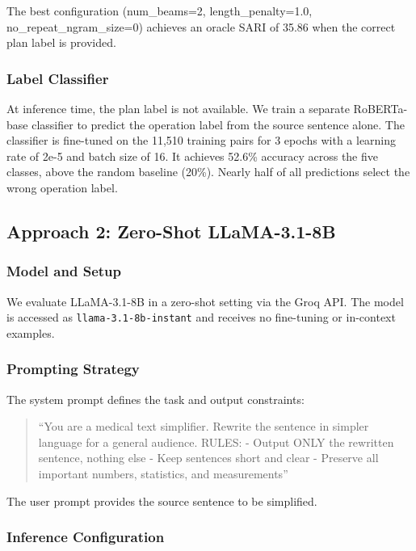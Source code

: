 \documentclass{ceurart}
\begin{document}
The best configuration (num\_beams=2, length\_penalty=1.0, no\_repeat\_ngram\_size=0) achieves an oracle SARI of 35.86 when the correct plan label is provided.

\subsubsection{Label Classifier}

At inference time, the plan label is not available.
	We train a separate RoBERTa-base classifier \cite{roberta2019} to predict the operation label from the source sentence alone.
The classifier is fine-tuned on the 11,510 training pairs for 3 epochs with a learning rate of 2e-5 and batch size of 16.
It achieves 52.6\% accuracy across the five classes, above the random baseline (20\%). Nearly half of all predictions select the wrong operation label.

\subsection{Approach 2: Zero-Shot LLaMA-3.1-8B}

\subsubsection{Model and Setup}

We evaluate LLaMA-3.1-8B \cite{llama3} in a zero-shot setting via the Groq API.
The model is accessed as \texttt{llama-3.1-8b-instant} and receives no fine-tuning or in-context examples.

\subsubsection{Prompting Strategy}

The system prompt defines the task and output constraints:

\begin{quote}
``You are a medical text simplifier. Rewrite the sentence in simpler language for a general audience. RULES: - Output ONLY the rewritten sentence, nothing else - Keep sentences short and clear - Preserve all important numbers, statistics, and measurements''
\end{quote}

The user prompt provides the source sentence to be simplified.

\subsubsection{Inference Configuration}
\end{document}
